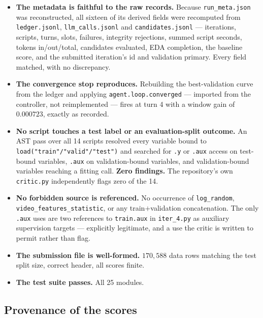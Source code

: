 \documentclass[11pt,a4paper]{article}
\newcommand{\code}[1]{\texttt{#1}}
\newcommand{\file}[1]{\texttt{#1}}
\begin{document}
\begin{itemize}[leftmargin=1.3em, itemsep=3pt]
  \item \textbf{The metadata is faithful to the raw records.} Because
        \file{run\_meta.json} was reconstructed, all sixteen of its derived fields were
        recomputed from \file{ledger.jsonl}, \file{llm\_calls.jsonl} and \file{candidates.jsonl}
        --- iterations, scripts, turns, slots, failures, integrity rejections, summed script
        seconds, tokens in/out/total, candidates evaluated, EDA completion, the baseline score,
        and the submitted iteration's id and validation primary. Every field matched, with no
        discrepancy.
  \item \textbf{The convergence stop reproduces.} Rebuilding the best-validation curve from the
        ledger and applying \code{agent.loop.converged} --- imported from the controller, not
        reimplemented --- fires at turn 4 with a window gain of $0.000723$, exactly as recorded.
  \item \textbf{No script touches a test label or an evaluation-split outcome.} An AST pass over
        all 14 scripts resolved every variable bound to \code{load("train"/"valid"/"test")} and
        searched for \code{.y} or \code{.aux} access on test-bound variables, \code{.aux} on
        validation-bound variables, and validation-bound variables reaching a fitting call.
        \textbf{Zero findings.} The repository's own \file{critic.py} independently flags zero
        of the 14.
  \item \textbf{No forbidden source is referenced.} No occurrence of \file{log\_random},
        \file{video\_features\_statistic}, or any train$+$validation concatenation. The only
        \code{.aux} uses are two references to \code{train.aux} in \file{iter\_4.py} as
        auxiliary supervision targets --- explicitly legitimate, and a use the critic is
        written to permit rather than flag.
  \item \textbf{The submission file is well-formed.} $170{,}588$ data rows matching the test
        split size, correct header, all scores finite.
  \item \textbf{The test suite passes.} All 25 modules.
\end{itemize}

\subsection{Provenance of the scores}
\end{document}
